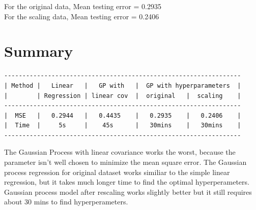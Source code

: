 \documentclass[12pt]{article}
\begin{document}
 For the original data, Mean testing error  = 0.2935\\
 For the scaling data, Mean testing error  = 0.2406\\

\cleardoublepage 

\section{Summary}
\begin{verbatim}
-----------------------------------------------------------------
| Method |   Linear   |   GP with   |  GP with hyperparameters  |
|        | Regression | linear cov  |  original   |  scaling    |
-----------------------------------------------------------------
|  MSE   |   0.2944   |   0.4435    |   0.2935    |   0.2406    |
|  Time  |     5s     |    45s      |   30mins    |   30mins    |
-----------------------------------------------------------------
\end{verbatim}

The Gaussian Process with linear covariance works the worst, because the parameter isn't well chosen to minimize the mean square error. The Gaussian process regression for original dataset works similiar to the simple linear regression, but it takes much longer time to find the optimal hyperperameters. Gaussian process model after rescaling works slightly better but it still requires about 30 mins to find hyperperameters.
\cleardoublepage 
\end{document}
